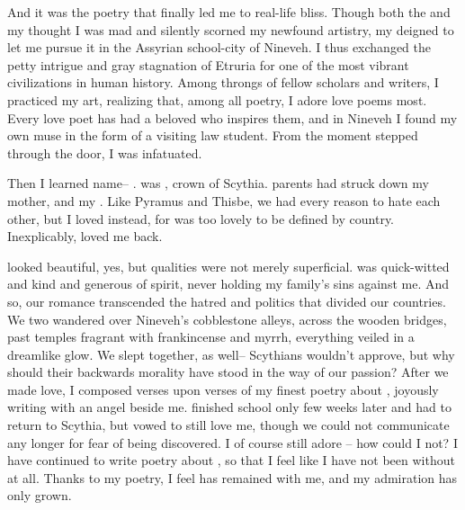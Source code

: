 \documentclass[char]{Kos}
\begin{document}
And it was the poetry that finally led me to real-life bliss. Though both the \cEtruriaKing{\monarch} and my \cGroom{} thought I was mad and silently scorned my newfound artistry, my \cEtruriaKing{\parent} deigned to let me pursue it in the Assyrian school-city of Nineveh. I thus exchanged the petty intrigue and gray stagnation of Etruria for one of the most vibrant civilizations in human history. Among throngs of fellow scholars and writers, I practiced my art, realizing that, among all poetry, I adore love poems most. Every love poet has had a beloved who inspires them, and in Nineveh I found my own muse in the form of a visiting law student. From the moment \cBride{\they} stepped through the door, I was infatuated.

Then I learned \cBride{\their} name-- \cBride{}. \cBride{\They} was \cBride{}, crown \cBride{\prince} of Scythia. \cBride{\Their} parents had struck down my mother, and my \cEtruriaKing{\parent} \cBride{\their} \cFugitive{\sibling}. Like Pyramus and Thisbe, we had every reason to hate each other, but I loved \cBride{\them} instead, for \cBride{\they} was too lovely to be defined by \cBride{\their} country. Inexplicably, \cBride{\they} loved me back.

\cBride{} looked beautiful, yes, but \cBride{\their} qualities were not merely superficial. \cBride{\They} was quick-witted and kind and generous of spirit, never holding my family's sins against me. And so, our romance transcended the hatred and politics that divided our countries. We two wandered over Nineveh's cobblestone alleys, across the wooden bridges, past temples fragrant with frankincense and myrrh, everything veiled in a dreamlike glow. We slept together, as well-- Scythians wouldn't approve, but why should their backwards morality have stood in the way of our passion? After we made love, I composed verses upon verses of my finest poetry about \cBride{\them}, joyously writing with an angel beside me. \cBride{\They} finished school only few weeks later and had to return to Scythia, but \cBride{\they} vowed to still love me, though we could not communicate any longer for fear of being discovered. I of course still adore \cBride{\them}-- how could I not? I have continued to write poetry about \cBride{\them}, so that I feel like I have not been without \cBride{\them} at all. Thanks to my poetry, I feel \cBride{\they} has remained with me, and my admiration has only grown.
\end{document}
